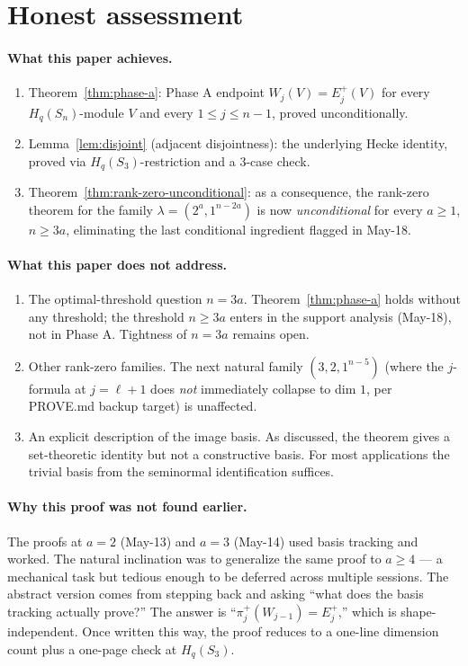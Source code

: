 \documentclass[11pt]{article}
\theoremstyle{definition}
\begin{document}
\section{Honest assessment}\label{sec:honest}

\paragraph{What this paper achieves.}
\begin{enumerate}[leftmargin=2em,topsep=0.3em,itemsep=0.2em]
\item Theorem~\ref{thm:phase-a}: Phase A endpoint
$W_j(V) = E_j^+(V)$ for every $H_q(S_n)$-module $V$ and every
$1 \le j \le n-1$, proved unconditionally.
\item Lemma~\ref{lem:disjoint} (adjacent disjointness): the
underlying Hecke identity, proved via $H_q(S_3)$-restriction and a
3-case check.
\item Theorem~\ref{thm:rank-zero-unconditional}: as a consequence,
the rank-zero theorem for the family
$\lambda = (2^a, 1^{n-2a})$ is now \emph{unconditional} for every
$a \ge 1$, $n \ge 3a$, eliminating the last conditional ingredient
flagged in May-18.
\end{enumerate}

\paragraph{What this paper does not address.}
\begin{enumerate}[leftmargin=2em,topsep=0.3em,itemsep=0.2em]
\item The optimal-threshold question $n = 3a$.  Theorem~\ref{thm:phase-a}
holds without any threshold; the threshold $n \ge 3a$ enters in
the support analysis (May-18), not in Phase A.  Tightness of
$n = 3a$ remains open.
\item Other rank-zero families.  The next natural family
$(3, 2, 1^{n-5})$ (where the $j$-formula at $j = \ell + 1$ does
\emph{not} immediately collapse to dim $1$, per PROVE.md backup
target) is unaffected.
\item An explicit description of the image basis.  As discussed,
the theorem gives a set-theoretic identity but not a constructive
basis.  For most applications the trivial basis from the seminormal
identification suffices.
\end{enumerate}

\paragraph{Why this proof was not found earlier.}  The proofs at
$a = 2$ (May-13) and $a = 3$ (May-14) used basis tracking and
worked.  The natural inclination was to generalize the same proof
to $a \ge 4$ --- a mechanical task but tedious enough to be
deferred across multiple sessions.  The
abstract version comes from stepping back and asking ``what does
the basis tracking actually prove?''  The answer is
``$\pi_j^+(W_{j-1}) = E_j^+$,'' which is shape-independent.  Once
written this way, the proof reduces to a one-line dimension count
plus a one-page check at $H_q(S_3)$.
\end{document}
